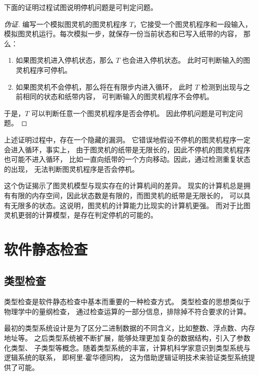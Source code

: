 \documentclass[twocolumn]{ctexart}
\begin{document}
下面的证明过程试图说明停机问题是可判定问题。

\begin{proof}[伪证]
    编写一个模拟图灵机的图灵机程序 $T$，它接受一个图灵机程序和一段输入，
    模拟图灵机运行。每次模拟一步，就保存一份当前状态和已写入纸带的内容，
    那么：

    \begin{enumerate}
        \item 如果图灵机进入停机状态，那么 $T$ 也会进入停机状态。
              此时可判断输入的图灵机程序可停机。

        \item 如果图灵机不会停机，那么将在有限步内进入循环，
              此时 $T$ 检测到出现与之前相同的状态和纸带内容，
              可判断输入的图灵机程序不会停机。
    \end{enumerate}

    于是，$T$ 可以判断任意一个图灵机程序是否会停机。
    因此停机问题是可判定问题。
\end{proof}

上述证明过程中，存在一个隐藏的漏洞。
它错误地假设不停机的图灵机程序一定会进入循环，事实上，
由于图灵机的纸带是无限长的，因此不停机的图灵机程序也可能不进入循环，
比如一直向纸带的一个方向移动。因此，通过检测重复状态的出现，
无法判断图灵机程序是否会停机。

这个伪证揭示了图灵机模型与现实存在的计算机间的差异。
现实的计算机总是拥有有限的内存空间，因此状态数是有限的，而图灵机的纸带是无限长的，
可以具有无限多的状态。这说明，图灵机的计算能力比现实的计算机更强。
而对于比图灵机更弱的计算模型，是存在判定停机的可能的。

\section{软件静态检查}

\subsection{类型检查}

类型检查是软件静态检查中基本而重要的一种检查方式。
类型检查的思想类似于物理学中的量纲检查\cite{typesystems}，
通过检查运算的一部分信息，排除掉不符合要求的计算。

最初的类型系统设计是为了区分二进制数据的不同含义，比如整数、浮点数、内存地址等。
之后类型系统被不断扩展，能够处理更加复杂的数据结构，引入了参数化类型、
子类型等概念。随着类型系统的丰富，计算机科学家意识到类型系统与逻辑系统的联系，
即柯里-霍华德同构\cite{curry1934,curry1958,howard1980}，
这为借助逻辑证明技术来验证类型系统提供了可能。
\end{document}
